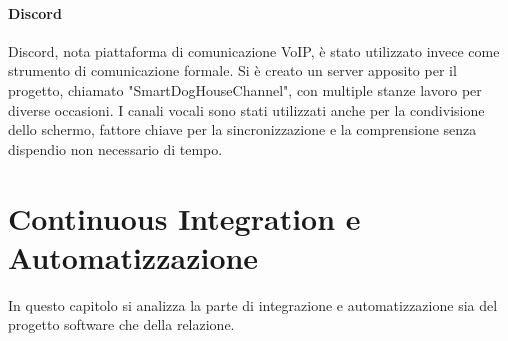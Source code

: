     \paragraph{Discord}
    Discord, nota piattaforma di comunicazione VoIP, è stato utilizzato invece come strumento di comunicazione formale. Si è creato un server apposito per il progetto, chiamato "SmartDogHouseChannel", con multiple stanze lavoro per diverse occasioni.
    I canali vocali sono stati utilizzati anche per la condivisione dello schermo, fattore chiave per la sincronizzazione e la comprensione senza dispendio non necessario di tempo. 

\section{Continuous Integration e Automatizzazione}
\label{chap:CI}
In questo capitolo si analizza la parte di integrazione e automatizzazione sia del progetto software che della relazione. 
